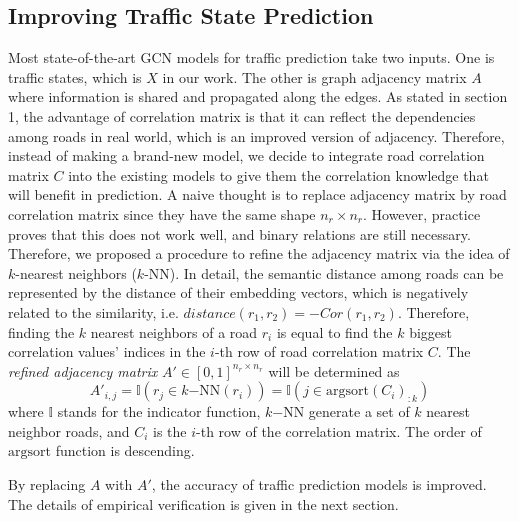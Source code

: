 \subsection{Improving Traffic State Prediction}
Most state-of-the-art GCN models for traffic prediction take two inputs. One is traffic states, which is $X$ in our work. The other is graph adjacency matrix $A$ where information is shared and propagated along the edges. As stated in section 1, the advantage of correlation matrix is that it can reflect the dependencies among roads in real world, which is an improved version of adjacency. Therefore, instead of making a brand-new model, we decide to integrate road correlation matrix $C$ into the existing models to give them the correlation knowledge that will benefit in prediction. A naive thought is to replace adjacency matrix by road correlation matrix since they have the same shape $n_r\times n_r$. However, practice proves that this does not work well, and binary relations are still necessary. Therefore, we proposed a procedure to refine the adjacency matrix via the idea of $k$-nearest neighbors ($k$-NN)\cite{knn}. In detail, the semantic distance among roads can be represented by the distance of their embedding vectors, which is negatively related to the similarity, i.e. $distance(r_1, r_2)=-Cor(r_1, r_2)$. Therefore, finding the $k$ nearest neighbors of a road $r_i$ is equal to find the $k$ biggest correlation values' indices in the $i$-th row of road correlation matrix $C$. The \textit{refined adjacency matrix} $A'\in[0, 1]^{n_r\times n_r}$ will be determined as
\begin{equation}
    A'_{i, j}=\mathbb{I}(r_j\in k\mathrm{-NN}(r_i))=\mathbb{I}(j\in \mathrm{argsort}(C_i)_{:k})
\end{equation}
where $\mathbb{I}$ stands for the indicator function, $k\mathrm{-NN}$ generate a set of $k$ nearest neighbor roads, and $C_i$ is the $i$-th row of the correlation matrix. The order of $\mathrm{argsort}$ function is descending.

By replacing $A$ with $A'$, the accuracy of traffic prediction models is improved. The details of empirical verification is given in the next section.

